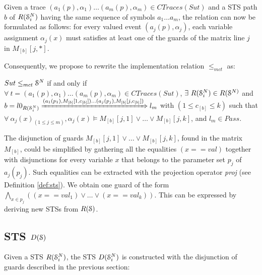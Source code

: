 Given a trace $(a_1(p), \alpha_1) \dots (a_m(p), \alpha_m) \in
CTraces({Sut})$ and a STS path $b$ of $R(\EuScript{S}_i^{N})$
having the same sequence of symbols $a_1 \dots a_m$, the relation
can now be formulated as follows: for every valued event
$(a_j(p), \alpha_j)$, each variable assignment $\alpha_j(x)$ must
satisfies at least one of the guards of the matrix line $j$ in
$M_{[b]}[j,*]$.

Consequently, we propose to rewrite the implementation relation
$\leq_{mct}$ as:

\begin{proposition}
    ${Sut} \leq_{mct} \EuScript{S}^{N}$ if and only if
    $\forall ~t = (a_1(p), \alpha_1) \dots (a_m(p), \alpha_m) \in
    CTraces({Sut})$, $\exists ~R(\EuScript{S}_i^{N}) \in
    R(\EuScript{S}^{N)}$ and
    $b = l0_{R(\EuScript{S}_i^{N})}
    \xRightarrow{(a_1(p_1),M_{[b]}[1,c_{[b]}]) \dots (a_j(p_j),M_{[b]}[j,c_{[b]}])}
    l_m$
    with $(1 \leq c_{[b]} \leq k)$ such that $\forall
    ~\alpha_j(x)_{(1 \leq j \leq m)}, \alpha_j(x) \models
    M_{[b]}[j,1] \vee \dots \vee  M_{[b]}[j,k]$, and $l_m \in Pass$.
\end{proposition}

The disjunction of guards $M_{[b]}[j,1] \vee \dots \vee
M_{[b]}[j,k]$, found in the matrix $M_{[b]}$, could be simplified
by gathering all the equalities $(x == val)$ together with
disjunctions for every variable $x$ that belongs to the parameter
set $p_j$ of $a_j(p_j)$. Such equalities can be extracted with
the projection operator \textit{proj} (see Definition
\ref{def:sts}). We obtain one guard of the form $\displaystyle
\bigwedge_{x \in p_j} ((x == val_1) \vee \dots \vee (x ==
val_k))$. This can be expressed by deriving new STSs from
$R(\EuScript{S})$.

\subsection{STS $D(\EuScript{S})$}

Given a STS $R(\EuScript{S}_i^{N})$, the STS
$D(\EuScript{S}_i^{N})$ is constructed with the disjunction of
guards described in the previous section:

